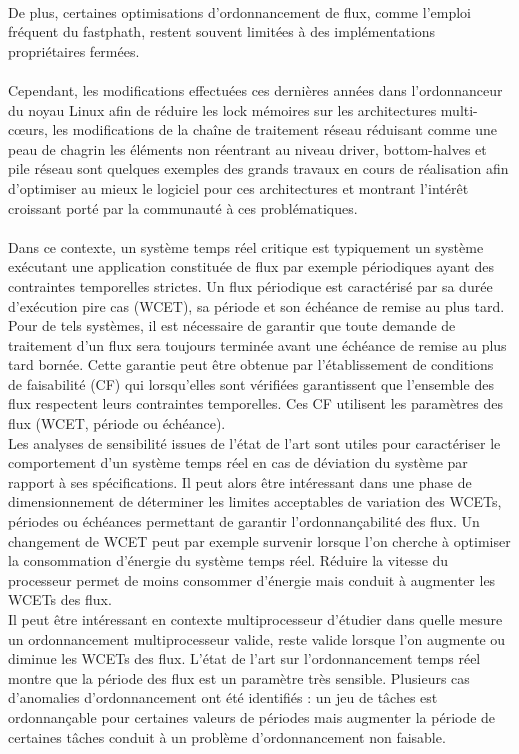 \paragraph{}
De plus, certaines optimisations d'ordonnancement de flux, comme l'emploi fréquent du
fastphath, restent souvent limitées à des implémentations propriétaires fermées.
\paragraph{}
Cependant, les modifications effectuées ces dernières années dans l'ordonnanceur du noyau
Linux afin de réduire les lock mémoires sur les architectures multi-c\oe urs, les
modifications de la chaîne de traitement réseau réduisant comme une peau de chagrin
les éléments non réentrant au niveau driver, bottom-halves et pile réseau sont
quelques exemples des grands travaux en cours de réalisation afin d'optimiser
au mieux le logiciel pour ces architectures et montrant l'intérêt croissant porté
par la communauté à ces problématiques.

\paragraph{}
Dans ce contexte, un système temps réel critique est typiquement un système exécutant
une application constituée de flux par exemple périodiques ayant des contraintes temporelles
strictes. Un flux périodique est caractérisé par sa durée d'exécution pire cas (WCET),
sa période et son échéance de remise au plus tard.\\
%
Pour de tels systèmes, il est nécessaire de garantir que toute demande de traitement
d'un flux sera toujours terminée avant une échéance de remise au plus tard bornée.
Cette garantie peut être obtenue par l'établissement de conditions de faisabilité (CF)
qui lorsqu'elles sont vérifiées garantissent que l'ensemble des flux respectent leurs
contraintes temporelles. Ces CF utilisent les paramètres des flux (WCET, période ou
échéance).\\
%
Les analyses de sensibilité issues de l'état de l'art sont utiles pour caractériser le
comportement d'un système temps réel en cas de déviation du système par
rapport à ses spécifications. Il peut alors être intéressant dans une phase de
dimensionnement de déterminer les limites acceptables de variation des WCETs,
périodes ou échéances permettant de garantir l'ordonnançabilité des flux. Un changement
de WCET peut par exemple survenir lorsque l'on cherche à optimiser la consommation d'énergie
du système temps réel. Réduire  la vitesse du processeur permet de moins consommer d'énergie
mais conduit à augmenter les WCETs des flux.\\
Il peut être intéressant en contexte multiprocesseur d'étudier dans quelle mesure un
ordonnancement multiprocesseur valide, reste valide lorsque l'on augmente ou diminue les
WCETs des flux. L'état de l'art sur l'ordonnancement temps réel montre que la période des
flux est un paramètre très sensible. Plusieurs cas d'anomalies d'ordonnancement ont été
identifiés : un jeu de tâches est ordonnançable pour certaines valeurs de périodes mais
augmenter la période de certaines tâches conduit à un problème d'ordonnancement non faisable.
